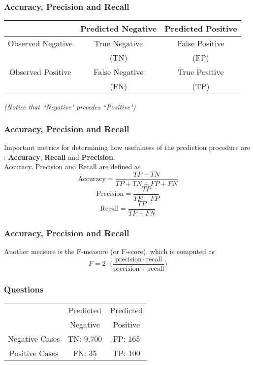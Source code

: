 \documentclass[a4]{beamer}
\begin{document}
\begin{frame}
	\frametitle{Accuracy, Precision and Recall}
	\large
	\begin{center}
		\begin{tabular}{|c|c|c|}
			\hline  & Predicted Negative & Predicted Positive \\ 
			\hline Observed Negative & True Negative & False Positive \\
			& (TN) & (FP)  
			\\
			\hline Observed Positive & False Negative & True Positive \\ 
			& (FN) & (TP)  \\
			\hline 
		\end{tabular} 
	\end{center}
\textit{	(Notice that ``Negative" precedes ``Positive")}
\end{frame}
\begin{frame}
	\frametitle{Accuracy, Precision and Recall}
	\large
	Important metrics for determining how usefulness of the prediction procedure are : \textbf{Accuracy}, \textbf{Recall} and \textbf{Precision}.
	\\ \bigskip
	Accuracy, Precision and Recall are defined as
	\[\mbox{Accuracy}=\frac{TP+TN}{TP+TN+FP+FN} \]
	\[\mbox{Precision}=\frac{TP}{TP+FP} \] 
	\[\mbox{Recall}=\frac{TP}{TP+FN} \]
\end{frame}
\begin{frame}
	\frametitle{Accuracy, Precision and Recall}
	Another measure is the F-measure (or F-score), which is computed as
	\[F = 2 \cdot \bigg( \frac{\mathrm{precision} \cdot \mathrm{recall}}{ \mathrm{precision} + \mathrm{recall}} \bigg)\]
	
\end{frame}
\begin{frame}
	\frametitle{Questions}
	\large
	\begin{center}
		\begin{tabular}{|c|c|c|}
			\hline
			& Predicted  & Predicted \\
			& Negative & Positive \\ \hline
			Negative Cases & TN: 9,700  & FP: 165 \\ \hline
			Positive Cases & FN: 35 & TP: 100 \\ \hline
		\end{tabular} 
	\end{center}
\end{frame}
\end{document}
